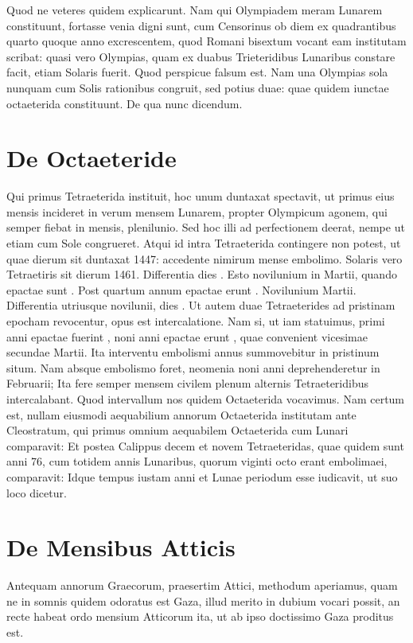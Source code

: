 Quod ne veteres quidem explicarunt.
Nam qui Olympiadem meram
Lunarem constituunt, fortasse venia digni sunt, cum Censorinus ob
diem ex quadrantibus quarto quoque anno excrescentem, quod Romani
bisextum vocant eam institutam scribat:
quasi vero Olympias,
quam ex duabus Trieteridibus Lunaribus constare facit, etiam Solaris
fuerit.
Quod perspicue falsum est.
Nam una Olympias sola nunquam
cum Solis rationibus congruit, sed potius duae: quae quidem iunctae
octaeterida constituunt.
De qua nunc dicendum.

\section{De Octaeteride}
Qui primus Tetraeterida instituit, hoc unum duntaxat spectavit,
ut primus eius mensis incideret in verum mensem Lunarem,
propter Olympicum agonem, qui semper fiebat in 
mensis, plenilunio.
Sed hoc illi ad perfectionem deerat, nempe ut etiam
cum Sole congrueret.
Atqui id intra Tetraeterida contingere non potest,
ut quae dierum sit duntaxat 1447: accedente nimirum mense embolimo.
Solaris vero Tetraetiris sit dierum 1461.
Differentia dies .
Esto novilunium in  Martii, quando epactae sunt .
Post quartum
annum epactae erunt .
Novilunium  Martii.
Differentia
utriusque novilunii, dies .
Ut autem duae Tetraeterides ad pristinam
epocham revocentur, opus est intercalatione.
Nam si, ut iam
statuimus, primi anni epactae fuerint ,
 noni anni epactae erunt ,
quae convenient vicesimae secundae Martii.
Ita interventu embolismi
annus summovebitur in pristinum situm.
Nam absque embolismo
foret, neomenia noni anni deprehenderetur in  Februarii;
Ita fere
semper mensem civilem plenum alternis Tetraeteridibus intercalabant.
Quod intervallum nos quidem Octaeterida vocavimus.
Nam
certum est, nullam eiusmodi aequabilium annorum Octaeterida institutam
ante Cleostratum, qui primus omnium aequabilem Octaeterida
cum Lunari comparavit:
Et postea Calippus decem et novem
Tetraeteridas, quae quidem sunt anni 76, cum totidem annis Lunaribus,
quorum viginti octo erant embolimaei, comparavit:
Idque
tempus iustam anni et Lunae periodum esse iudicavit, ut suo loco dicetur.

\section{De Mensibus Atticis}
Antequam annorum Graecorum, praesertim Attici, methodum
aperiamus, quam ne in somnis quidem odoratus est Gaza,
illud merito in dubium vocari possit, an recte habeat ordo mensium
Atticorum ita, ut ab ipso doctissimo Gaza proditus est.

